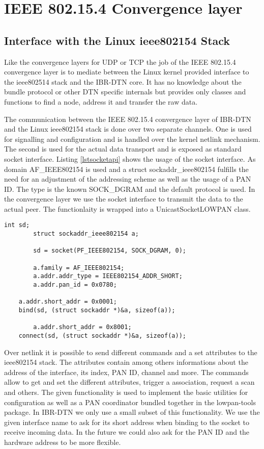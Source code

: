 \chapter{IEEE 802.15.4 Convergence layer}
\label{802154layer}
\section{Interface with the Linux ieee802154 Stack}

Like the convergence layers for UDP or TCP the job of the IEEE 802.15.4
convergence layer is to mediate between the Linux kernel provided interface
to the ieee802514 stack and the IBR-DTN core. It has no knowledge about the
bundle protocol or other DTN specific internals but provides only classes and
functions to find a node, address it and transfer the raw data.

The communication between the IEEE 802.15.4 convergence layer of IBR-DTN and the
Linux ieee802154 stack is done over two separate channels. One is used for
signalling and configuration and is handled over the kernel netlink mechanism.
The second is used for the actual data transport and is exposed as standard
socket interface. Listing \ref{lstsocketapi} shows the usage of the socket interface.
As domain AF\_IEEE802154 is used and a struct sockaddr\_ieee802154 fulfills the
need for an adjustment of the addressing scheme as well as the usage of a PAN
ID. The type is the known SOCK\_DGRAM and the default protocol is used. In the
convergence layer we use the socket interface to transmit the data to the actual
peer. The functionlaity is wrapped into a UnicastSocketLOWPAN class.

\begin{lstlisting}[caption= ieee802154 socket interface, label=lstsocketapi]
        int sd;
        struct sockaddr_ieee802154 a;

        sd = socket(PF_IEEE802154, SOCK_DGRAM, 0);

        a.family = AF_IEEE802154;
        a.addr.addr_type = IEEE802154_ADDR_SHORT;
        a.addr.pan_id = 0x0780;

	a.addr.short_addr = 0x0001;
	bind(sd, (struct sockaddr *)&a, sizeof(a));

        a.addr.short_addr = 0x8001;
	connect(sd, (struct sockaddr *)&a, sizeof(a));
\end{lstlisting}

Over netlink it is possible to send different commands and a set attributes to the
ieee802154 stack. The attributes contain among others informations about the
address of the interface, its index, PAN ID, channel and more. The commands
allow to get and set the different attributes, trigger a association, request a
scan and others. The given functionality is used to implement the basic
utilities for configuration as well as a PAN coordinator bundled together in
the lowpan-tools package. In IBR-DTN we only use a small subset of this
functionality. We use the given interface name to ask for its short address when
binding to the socket to receive incoming data. In the future we could also ask for
the PAN ID and the hardware address to be more flexible.

